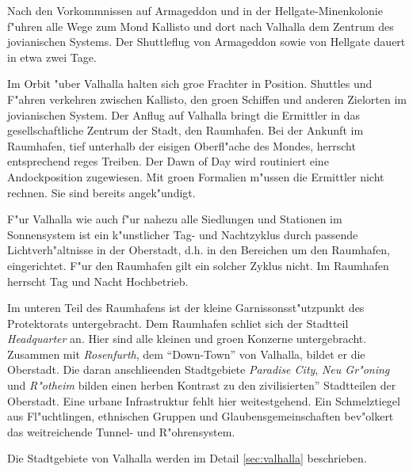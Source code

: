 
Nach den Vorkommnissen auf Armageddon und in der Hellgate-Minenkolonie f"uhren alle Wege zum Mond Kallisto und dort nach Valhalla dem  Zentrum des jovianischen Systems. Der Shuttleflug von Armageddon sowie von Hellgate dauert in etwa zwei Tage.


Im Orbit "uber Valhalla halten sich gro\3e Frachter in Position. Shuttles und F"ahren verkehren zwischen Kallisto, den gro\3en Schiffen und anderen Zielorten im jovianischen System. Der Anflug auf Valhalla bringt die Ermittler in das gesellschaftliche Zentrum der Stadt, den Raumhafen. Bei der Ankunft im Raumhafen, tief unterhalb der eisigen Oberfl"ache des Mondes, herrscht entsprechend reges Treiben. Der Dawn of Day wird routiniert eine Andockposition zugewiesen. Mit gro\3en Formalien m"ussen die Ermittler nicht rechnen. Sie sind bereits angek"undigt.

F"ur Valhalla wie auch f"ur nahezu alle Siedlungen und Stationen im Sonnensystem ist ein k"unstlicher Tag- und Nachtzyklus durch passende Lichtverh"altnisse in der Oberstadt, d.h. in den Bereichen um den Raumhafen, eingerichtet. F"ur den Raumhafen gilt ein solcher Zyklus nicht. Im Raumhafen herrscht Tag und Nacht Hochbetrieb.

Im unteren Teil des Raumhafens ist der kleine Garnissonsst"utzpunkt des Protektorats untergebracht. Dem Raumhafen schlie\3t sich der Stadtteil \emph{Headquarter} an. Hier sind alle kleinen und gro\3en Konzerne untergebracht. Zusammen mit \emph{Rosenfurth}, dem ``Down-Town'' von Valhalla, bildet er die Oberstadt. Die daran anschlie\3enden Stadtgebiete \emph{Paradise City}, \emph{Neu Gr"oning} und \emph{R"otheim} bilden einen herben Kontrast zu den zivilisierten'' Stadtteilen der Oberstadt. Eine urbane Infrastruktur fehlt hier weitestgehend. Ein Schmelztiegel aus Fl"uchtlingen, ethnischen Gruppen und Glaubensgemeinschaften bev"olkert das weitreichende Tunnel- und R"ohrensystem.

\begin{remarks}
    Die Stadtgebiete von Valhalla werden im Detail \cref{sec:valhalla} beschrieben.
\end{remarks}
